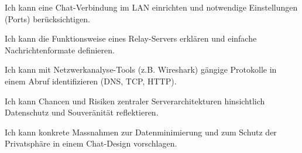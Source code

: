 \begin{todolist}
\item Ich kann eine Chat-Verbindung im \gls{LAN} einrichten und notwendige Einstellungen (Ports) berücksichtigen.
 \item Ich kann die Funktionsweise eines Relay-Servers erklären und einfache Nachrichtenformate definieren.
 \item Ich kann mit Netzwerkanalyse-Tools (z.B. Wireshark) gängige Protokolle in einem Abruf identifizieren (\gls{DNS}, \gls{TCP}, \gls{HTTP}).
 \item Ich kann Chancen und Risiken zentraler Serverarchitekturen hinsichtlich Datenschutz und Souveränität reflektieren.
 \item Ich kann konkrete Massnahmen zur Datenminimierung und zum Schutz der Privatsphäre in einem Chat-Design vorschlagen.
\end{todolist}
